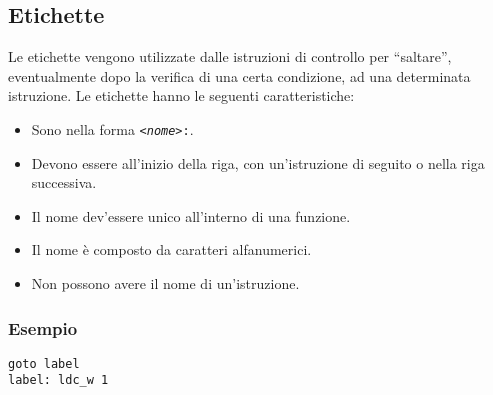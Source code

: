 \subsection{Etichette}
\label{sec:etichette}
Le etichette vengono utilizzate dalle istruzioni di controllo per ``saltare'', eventualmente dopo la verifica di una certa condizione, ad una determinata istruzione. Le etichette hanno le seguenti caratteristiche:
\begin{itemize}
  \item Sono nella forma \texttt{\textit{<nome>}:}.
  \item Devono essere all'inizio della riga, con un'istruzione di seguito o nella riga successiva.
  \item Il nome dev'essere unico all'interno di una funzione.
  \item Il nome \`e composto da caratteri alfanumerici.
  \item Non possono avere il nome di un'istruzione.
\end{itemize}
\subsubsection*{Esempio}
\begin{verbatim}
goto label
label: ldc_w 1
\end{verbatim}
